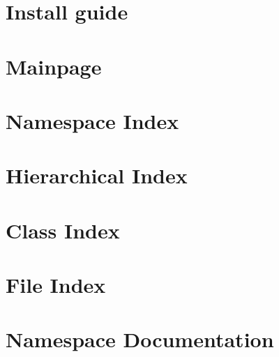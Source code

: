 \let\mypdfximage\pdfximage\def\pdfximage{\immediate\mypdfximage}\documentclass[twoside]{book}
\newcommand{\+}{\discretionary{\mbox{\scriptsize$\hookleftarrow$}}{}{}}
\begin{document}
\chapter{Install guide}
\label{md_docs_markdown_install_guide}

\chapter{Mainpage}
\label{md_docs_markdown_mainpage}

\chapter{Namespace Index}

\chapter{Hierarchical Index}

\chapter{Class Index}

\chapter{File Index}

\chapter{Namespace Documentation}












\end{document}
